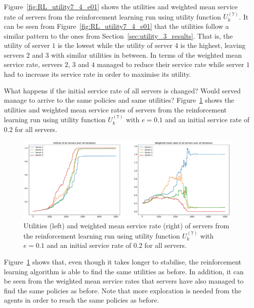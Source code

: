 Figure~\ref{fig:RL_utility7_4_e01} shows the utilities and weighted mean
service rate of servers from the reinforcement learning run using utility
function \(U_k^{(7)}\).
It can be seen from Figure~\ref{fig:RL_utility7_4_e01} that the utilities
follow a similar pattern to the ones from Section~\ref{sec:utility_3_results}.
That is, the utility of server \(1\) is the lowest while the utility of server
\(4\) is the highest, leaving servers \(2\) and \(3\) with similar utilities
in between.
In terms of the weighted mean service rate, servers \(2\), \(3\) and \(4\)
managed to reduce their service rate while server \(1\) had to increase its
service rate in order to maximise its utility.

What happens if the initial service rate of all servers is changed?
Would served manage to arrive to the same policies and same utilities?
Figure~\ref{fig:RL_utility7_4_e01_initial_02} shows the utilities and weighted
mean service rates of servers from the reinforcement learning run using utility
function \(U_k^{(7)}\) with \(e = 0.1\) and an initial service rate of
\(0.2\) for all servers.

\begin{figure}[H]
    \includegraphics[width=\textwidth]{chapters/06_agent_based_extension/Bin/reinforcement_learning_results/utility_7/u7_4_e01_initial_02.pdf}
    \caption{Utilities (left) and weighted mean service rate (right) of servers
    from the reinforcement learning run using utility function \(U_k^{(7)}\)
    with \(e = 0.1\) and an initial service rate of \(0.2\) for all servers.}
    \label{fig:RL_utility7_4_e01_initial_02}
\end{figure}

Figure~\ref{fig:RL_utility7_4_e01_initial_02} shows that, even though it takes
longer to stabilise, the reinforcement learning algorithm is able to find the
same utilities as before.
In addition, it can be seen from the weighted mean service rates that servers
have also managed to find the same policies as before.
Note that more exploration is needed from the agents in order to reach the
same policies as before.

